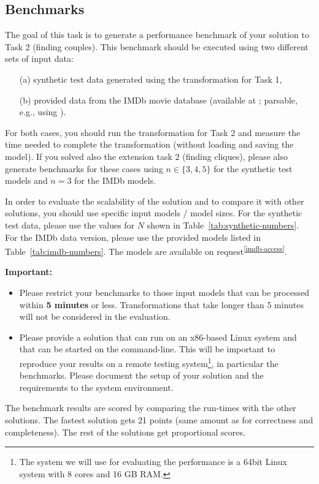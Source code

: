 \documentclass[a4paper,11pt]{article}
\begin{document}
\subsection{Benchmarks}

The goal of this task is to generate a performance benchmark
of your solution to Task 2 (finding couples). This benchmark should be
executed using two different sets of input data:
\begin{enumerate}
\item[(a)] synthetic test data generated using the transformation for Task 1, 
\item[(b)] provided data from the IMDb movie database (available at \cite{IMDBDATA}; parsable, e.g., using \cite{IMDB2EMF}).
\end{enumerate}
For both cases, you should run the transformation for Task 2 
and measure the time needed to complete the transformation 
(without loading and saving the model).
If you solved also the extension task 2 (finding cliques), please also generate
benchmarks for these cases using \(n \in \{3,4,5\}\) for the synthetic test
models and \(n = 3\) for the IMDb models.

In order to evaluate the scalability of the solution and to compare it with other solutions,
you should use specific input models / model sizes. For the synthetic test data, please use
the values for $N$ shown in Table~\ref{tab:synthetic-numbers}. For the IMDb data version,
please use the provided models listed in Table~\ref{tab:imdb-numbers}. The models
are available on request\textsuperscript{\ref{imdb-access}}.


\noindent
\textbf{Important:}
\begin{itemize}
\item Please restrict your benchmarks to those input models that can be
processed within \textbf{5 minutes} or less. Transformations that take longer than 5 minutes
will not be considered in the evaluation.
\item Please provide a solution that can run on an x86-based Linux system and
  that can be started on the command-line. This will be important to reproduce
  your results on a remote testing system\footnote{The system we will use for
    evaluating the performance is a 64bit Linux system with 8 cores and 16 GB
    RAM.}, in particular the benchmarks.  Please document the setup of your
  solution and the requirements to the system environment.
\end{itemize}
The benchmark results are scored by comparing the run-times with the
other solutions. The fastest solution gets 21 points (same amount as for
correctness and completeness). The rest of the solutions get proportional
scores.
\end{document}
